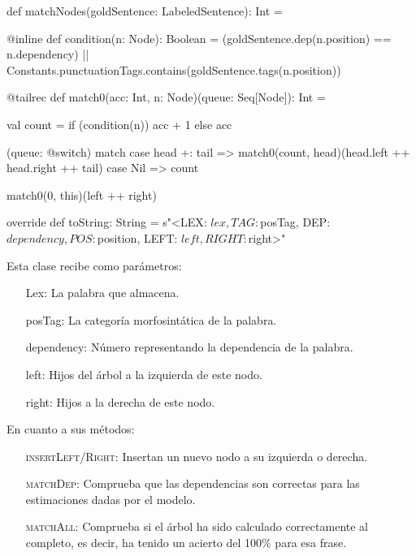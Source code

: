 \begin{scala2}
{  def matchNodes(goldSentence: LabeledSentence): Int = {
    @inline def condition(n: Node): Boolean =
      (goldSentence.dep(n.position) == n.dependency) || Constants.punctuationTags.contains(goldSentence.tags(n.position))

    @tailrec
    def match0(acc: Int, n: Node)(queue: Seq[Node]): Int = {
      val count = if (condition(n)) acc + 1 else acc

      (queue: @switch) match {
        case head +: tail => match0(count, head)(head.left ++ head.right ++ tail)
        case Nil => count
      }
    }

    match0(0, this)(left ++ right)
  }

  override def toString: String = s"<LEX: $lex, TAG: $posTag, DEP: $dependency, POS: $position, LEFT: $left, RIGHT:  $right>"
}
\end{scala2}
Esta clase recibe como parámetros:
\begin{itemize}
   \item [Lex:] La palabra que almacena.
   \item [posTag:] La categoría morfosintática de la palabra.
   \item [dependency:] Número representando la dependencia de la palabra.
   \item [left:] Hijos del árbol a la izquierda de este nodo.
   \item [right:] Hijos a la derecha de este nodo.
\end{itemize}
En cuanto a sus métodos:
\begin{itemize}
   \item [\textsc{insertLeft/Right}:] Insertan un nuevo nodo a su izquierda o
     derecha.
   \item [\textsc{matchDep}:] Comprueba que las dependencias son correctas para las
     estimaciones dadas por el modelo.
   \item [\textsc{matchAll}:] Comprueba si el árbol ha sido calculado correctamente al
     completo, es decir, ha tenido un acierto del 100\% para esa frase.
\end{itemize}


